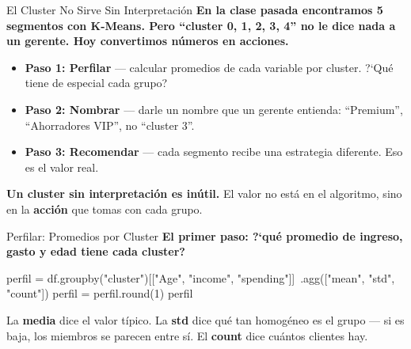 \documentclass[aspectratio=169, 11pt]{beamer}
\begin{document}
\begin{frame}{El Cluster No Sirve Sin Interpretaci\'on}
  \vspace{-4pt}
  {\footnotesize\color{arcaDark}\bfseries
    En la clase pasada encontramos 5 segmentos con K-Means. Pero
    ``cluster 0, 1, 2, 3, 4'' no le dice \textbf{nada} a un gerente.
    Hoy convertimos n\'umeros en \textbf{acciones}.}

  \vspace{6pt}
  {\footnotesize
  \begin{itemize}\setlength{\itemsep}{5pt}
    \item[{\color{arcaRed}\scriptsize\faArrowRight}]
      \textbf{Paso 1: Perfilar} --- calcular promedios de cada variable
      por cluster. ?`Qu\'e tiene de especial cada grupo?
    \item[{\color{arcaRed}\scriptsize\faArrowRight}]
      \textbf{Paso 2: Nombrar} --- darle un nombre que un gerente entienda:
      ``Premium'', ``Ahorradores VIP'', no ``cluster 3''.
    \item[{\color{codeGreen}\scriptsize\faArrowRight}]
      \textbf{Paso 3: Recomendar} --- cada segmento recibe una
      estrategia diferente. Eso es el valor real.
  \end{itemize}
  }

  \vspace{4pt}
  \begin{tcolorbox}[colback=arcaGray, colframe=arcaRed, boxrule=0.5pt, arc=2pt,
    left=6pt, right=6pt, top=4pt, bottom=4pt]
    {\scriptsize\color{arcaDark}
    \faKey\hspace{4pt}\textbf{Un cluster sin interpretaci\'on es in\'util.}
    El valor no est\'a en el algoritmo, sino en la \textbf{acci\'on}
    que tomas con cada grupo.}
  \end{tcolorbox}
\end{frame}

\begin{frame}[fragile,shrink=10]{Perfilar: Promedios por Cluster}
  \vspace{-4pt}
  {\footnotesize\color{arcaDark}\bfseries
    El primer paso: ?`qu\'e promedio de ingreso, gasto y edad tiene
    cada cluster?}

  \vspace{4pt}
  \begin{pyblock}
perfil = df.groupby("cluster")[["Age", "income", "spending"]]\
    .agg(["mean", "std", "count"])
perfil = perfil.round(1)
perfil
  \end{pyblock}

  \vspace{4pt}
  {\scriptsize\color{arcaDark}
    \faKey\hspace{4pt} La \textbf{media} dice el valor t\'ipico.
    La \textbf{std} dice qu\'e tan homog\'eneo es el grupo ---
    si es baja, los miembros se parecen entre s\'i.
    El \textbf{count} dice cu\'antos clientes hay.}
\end{frame}
\end{document}
